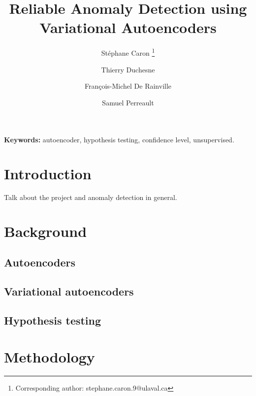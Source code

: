 \documentclass{article}
\begin{document}
\title{\bf Reliable Anomaly Detection using Variational Autoencoders}


\author[1]{St{\'e}phane Caron \thanks{Corresponding author: stephane.caron.9@ulaval.ca}}
\author[1]{Thierry Duchesne}
\author[2]{Fran\c{c}ois-Michel De Rainville}
\author[1]{Samuel Perreault}



\maketitle


\begin{abstract}

\end{abstract}

\textbf{Keywords:} autoencoder, hypothesis testing, confidence level, unsupervised.


\newpage

\section{Introduction}

Talk about the project and anomaly detection in general.

\section{Background}

\subsection{Autoencoders}

\subsection{Variational autoencoders}

\subsection{Hypothesis testing}

\section{Methodology}
\end{document}
